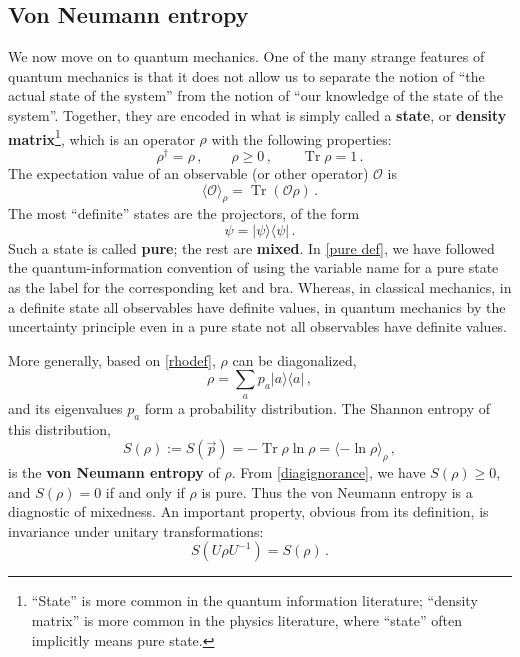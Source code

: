 \documentclass[11pt]{article}
\newcommand{\ket}[1]{|{#1}\rangle}
\newcommand{\bra}[1]{\langle{#1}|}
\newcommand{\ev}[1]{\langle{#1}\rangle}
\newcommand{\OO}{\mathcal{O}}
\DeclareMathOperator{\Tr}{Tr}
\begin{document}
\subsection{Von Neumann entropy}\label{sec:vne}

We now move on to quantum mechanics. One of the many strange features of quantum mechanics is that it does not allow us to separate the notion of ``the actual state of the system'' from the notion of ``our knowledge of the state of the system''. Together, they are encoded in what is simply called a \textbf{state}, or \textbf{density matrix}\footnote{``State'' is more common in the quantum information literature; ``density matrix'' is more common in the physics literature, where ``state'' often implicitly means pure state.}, which is an operator $\rho$ with the following properties:
\begin{equation}\label{rhodef}
\rho^\dag = \rho\,,\qquad
\rho\ge0\,,\qquad
\Tr\rho = 1\,.
\end{equation}
The expectation value of an observable (or other operator) $\OO$ is
\begin{equation}
\ev{\OO}_\rho = \Tr(\OO\rho)\,.
\end{equation}
The most ``definite'' states are the projectors, of the form
\begin{equation}\label{pure def}
\psi=\ket{\psi}\bra{\psi}\,.
\end{equation}
Such a state is called \textbf{pure}; the rest are \textbf{mixed}. In \eqref{pure def}, we have followed the quantum-information convention of using the variable name for a pure state as the label for the corresponding ket and bra. 
Whereas, in classical mechanics, in a definite state all observables have definite values, in quantum mechanics by the uncertainty principle even in a pure state not all observables have definite values.

More generally, based on \eqref{rhodef}, $\rho$ can be diagonalized,
\begin{equation}
\rho = \sum_ap_a\ket{a}\bra{a}\,,
\end{equation}
and its eigenvalues $p_a$ form a probability distribution. The Shannon entropy of this distribution,
\begin{equation}\label{vN def}
S(\rho) := S(\vec p) = -\Tr\rho\ln\rho = \ev{-\ln\rho}_\rho\,,
\end{equation}
is the \textbf{von Neumann entropy} of $\rho$. From \eqref{diagignorance}, we have $S(\rho)\ge0$, and $S(\rho)=0$ if and only if $\rho$ is pure. Thus the von Neumann entropy is a diagnostic of mixedness. An important property, obvious from its definition, is invariance under unitary transformations:
\begin{equation}
S(U\rho U^{-1}) = S(\rho)\,.
\end{equation}
\end{document}
